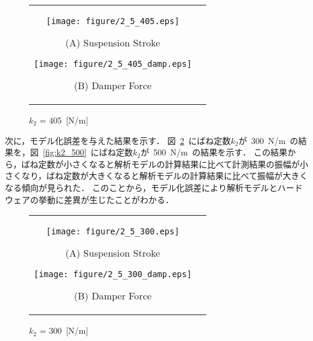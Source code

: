 \documentclass[a4paper,12pt]{article_vdlab_sotsuron}
\begin{document}
\vspace{15mm}
\begin{figure}[h]
    \begin{tabular}{cc}
      \begin{minipage}{0.45\hsize}
	\centering
	  \texttt{[image: figure/2\_5\_405.eps]}
	  \begin{center}
	  \vspace{2mm}
	  \ (A) Suspension Stroke\
	  \end{center}
	\end{minipage}
       \begin{minipage}{0.5\hsize}
	\centering
	  \texttt{[image: figure/2\_5\_405\_damp.eps]}
	  \begin{center}
	  \vspace{2mm}
	  \ (B) Damper Force\
	  \end{center}
      \end{minipage}
    \end{tabular}
    \vspace{2mm}
    \caption{$k_2$ = 405~[N/m]}
    \label{fig:k2_405}
\end{figure}

\newpage
次に，モデル化誤差を与えた結果を示す．
図~\ref{fig:k2_300}~にばね定数$k_2$が~300~N/m~の結果を，図~\ref{fig:k2_500}~にばね定数$k_2$が~500~N/m~の結果を示す．
この結果から，ばね定数が小さくなると解析モデルの計算結果に比べて計測結果の振幅が小さくなり，ばね定数が大きくなると解析モデルの計算結果に比べて振幅が大きくなる傾向が見られた．
このことから，モデル化誤差により解析モデルとハードウェアの挙動に差異が生じたことがわかる．
\vspace{10mm}
\begin{figure}[h]
    \begin{tabular}{cc}
      \begin{minipage}{0.45\hsize}
	\centering
	\vspace{20mm}
	  \texttt{[image: figure/2\_5\_300.eps]}
	  \begin{center}
	  \vspace{2mm}
	  \ (A) Suspension Stroke\
	  \end{center}
	\end{minipage}
       \begin{minipage}{0.5\hsize}
	\centering
	\vspace{20mm}
	  \texttt{[image: figure/2\_5\_300\_damp.eps]}
	  \begin{center}
	  \vspace{2mm}
	  \ (B) Damper Force\
	  \end{center}
      \end{minipage}
    \end{tabular}
    \vspace{2mm}
    \caption{$k_2$ = 300~[N/m]}
    \label{fig:k2_300}
\end{figure}
\end{document}
